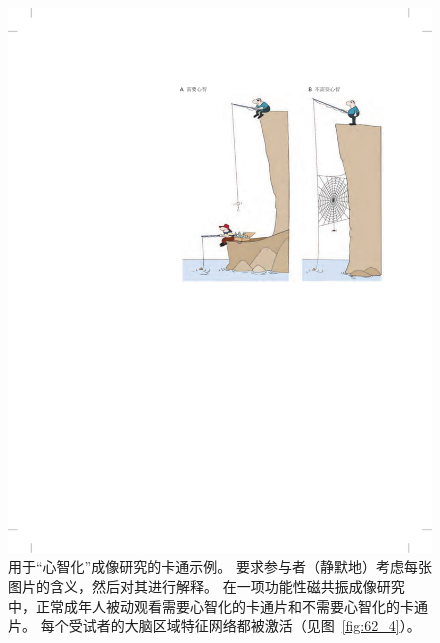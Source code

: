 \begin{figure}[htbp]
	\centering
	\includegraphics[width=0.75\linewidth]{chap62/fig_62_3}
	\caption{用于“心智化”成像研究的卡通示例。
		要求参与者（静默地）考虑每张图片的含义，然后对其进行解释。
		在一项功能性磁共振成像研究中，正常成年人被动观看需要心智化的卡通片和不需要心智化的卡通片。
		每个受试者的大脑区域特征网络都被激活（见图~\ref{fig:62_4}）\cite{gallagher2000reading}。}
	\label{fig:62_3}
\end{figure}


